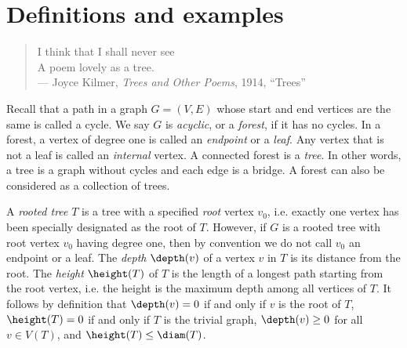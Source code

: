 
\section{Definitions and examples}
\label{sec:trees_forests:definitions_examples}

\begin{quote}
\footnotesize
I think that I shall never see \\
A poem lovely as a tree. \\
\noindent
--- Joyce Kilmer, \emph{Trees and Other Poems}, 1914, ``Trees''
\end{quote}

\noindent
Recall that a path in a graph $G = (V, E)$ whose start and
end vertices are the same is called a cycle. We say $G$ is
\emph{acyclic}, or a \emph{forest}, if it
has no cycles. In a forest, a vertex of degree one is called an
\emph{endpoint} or a
\emph{leaf}. Any vertex that is not a
leaf is called an \emph{internal} vertex. A
connected forest is a \emph{tree}. In other
words, a tree is a graph without cycles and
each edge is a bridge. A forest can also be considered
as a collection of trees.

A \emph{rooted tree} $T$ is a tree with
a specified \emph{root} vertex $v_0$, i.e. exactly
one vertex has been specially designated as the root of $T$. However,
if $G$ is a rooted tree with root vertex $v_0$
having degree one, then by convention we do not call $v_0$ an
endpoint or a leaf. The
\emph{depth}
$\depth(v)$ of a vertex $v$ in $T$ is its
distance from the
root. The \emph{height}
$\height(T)$ of $T$ is the
length of a longest path starting from
the root vertex, i.e. the height
is the maximum depth among all vertices of $T$. It
follows by definition that $\depth(v) = 0$ if and
only if $v$ is the root of $T$, $\height(T) = 0$ if
and only if $T$ is the trivial graph,
$\depth(v) \geq 0$ for all $v \in V(T)$, and
$\height(T) \leq \diam(T)$.

